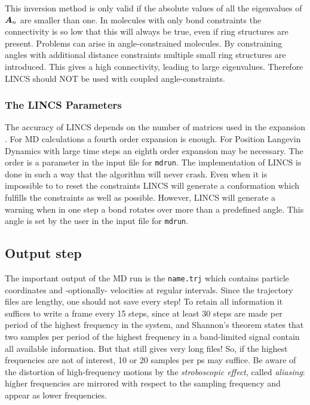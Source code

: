 This inversion method is only valid if the absolute values of all the
eigenvalues of $\mbox{\boldmath ${A}$}_n$ are smaller than one.
In molecules with only bond constraints the connectivity is so low
that this will always be true, even if ring structures are present.
Problems can arise in angle-constrained molecules.
By constraining angles with additional distance constraints
multiple small ring structures are introduced.
This gives a high connectivity, leading to large eigenvalues.
Therefore LINCS should NOT be used with coupled angle-constraints.

\subsubsection*{The LINCS Parameters}
The accuracy of LINCS depends on the number of matrices used
in the expansion . For MD calculations a fourth order
expansion is enough. For Position Langevin Dynamics with
large time steps an eighth order expansion may be necessary.
The order is a parameter in the input file for \verb'mdrun'.
The implementation of LINCS is done in such a way that the 
algorithm will never crash. Even when it is impossible to
to reset the constraints LINCS will generate a conformation
which fulfills the constraints as well as possible.
However, LINCS will generate a warning when in one step a bond 
rotates over more than a predefined angle.
This angle is set by the user in the input file for \verb'mdrun'.


\subsection{Output step}
The important output of the MD run is the {\em
{}} \verb'name.trj' which contains particle coordinates
and -optionally- velocities at regular intervals. Since the trajectory
files are lengthy, one should not save every step! To retain all
information it suffices to write a frame every 15 steps, since at
least 30 steps are made per period of the highest frequency in the
system, and Shannon's  theorem states that two samples per
period of the highest frequency in a band-limited signal contain all
available information. But that still gives very long files! So, if
the highest frequencies are not of interest, 10 or 20 samples per ps
may suffice. Be aware of the distortion of high-frequency motions by
the {\em stroboscopic effect}, called {\em aliasing}: higher frequencies
are  mirrored with respect to the sampling frequency and appear as
lower frequencies. 

